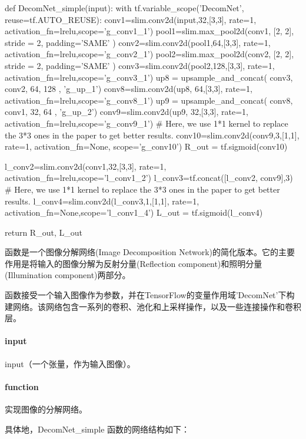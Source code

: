 \documentclass[letterpaper,12pt]{article}
\begin{document}
		\begin{python}
		def DecomNet_simple(input):
			with tf.variable_scope('DecomNet', reuse=tf.AUTO_REUSE):
				conv1=slim.conv2d(input,32,[3,3], rate=1, activation_fn=lrelu,scope='g_conv1_1')
				pool1=slim.max_pool2d(conv1, [2, 2], stride = 2, padding='SAME' )
				conv2=slim.conv2d(pool1,64,[3,3], rate=1, activation_fn=lrelu,scope='g_conv2_1')
				pool2=slim.max_pool2d(conv2, [2, 2], stride = 2, padding='SAME' )
				conv3=slim.conv2d(pool2,128,[3,3], rate=1, activation_fn=lrelu,scope='g_conv3_1')
				up8 =  upsample_and_concat( conv3, conv2, 64, 128 , 'g_up_1')
				conv8=slim.conv2d(up8,  64,[3,3], rate=1, activation_fn=lrelu,scope='g_conv8_1')
				up9 =  upsample_and_concat( conv8, conv1, 32, 64 , 'g_up_2')
				conv9=slim.conv2d(up9,  32,[3,3], rate=1, activation_fn=lrelu,scope='g_conv9_1')
				# Here, we use 1*1 kernel to replace the 3*3 ones in the paper to get better results.
				conv10=slim.conv2d(conv9,3,[1,1], rate=1, activation_fn=None, scope='g_conv10')
				R_out = tf.sigmoid(conv10)
				
				l_conv2=slim.conv2d(conv1,32,[3,3], rate=1, activation_fn=lrelu,scope='l_conv1_2')
				l_conv3=tf.concat([l_conv2, conv9],3)
				# Here, we use 1*1 kernel to replace the 3*3 ones in the paper to get better results.
				l_conv4=slim.conv2d(l_conv3,1,[1,1], rate=1, activation_fn=None,scope='l_conv1_4')
				L_out = tf.sigmoid(l_conv4)
				
				return R_out, L_out
		\end{python}
	
		函数是一个图像分解网络(Image Decomposition Network)的简化版本。它的主要作用是将输入的图像分解为反射分量(Reflection component)和照明分量(Illumination component)两部分。
		
		函数接受一个输入图像作为参数，并在TensorFlow的变量作用域'DecomNet'下构建网络。该网络包含一系列的卷积、池化和上采样操作，以及一些连接操作和卷积层。
	
		\paragraph{input}
		
		input（一个张量，作为输入图像）。
		
		\paragraph{function}
		
		实现图像的分解网络。
		
		具体地，DecomNet\_simple 函数的网络结构如下：
		
\end{document}
